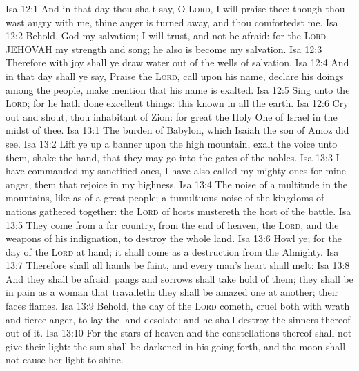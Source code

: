 \vs Isa 12:1 And in that day thou shalt say, O \textsc{Lord}, I will praise thee: though thou wast angry with me, thine anger is turned away, and thou comfortedst me.
\vs Isa 12:2 Behold, God  my salvation; I will trust, and not be afraid: for the \textsc{Lord} JEHOVAH  my strength and  song; he also is become my salvation.
\vs Isa 12:3 Therefore with joy shall ye draw water out of the wells of salvation.
\vs Isa 12:4 And in that day shall ye say, Praise the \textsc{Lord}, call upon his name, declare his doings among the people, make mention that his name is exalted.
\vs Isa 12:5 Sing unto the \textsc{Lord}; for he hath done excellent things: this  known in all the earth.
\vs Isa 12:6 Cry out and shout, thou inhabitant of Zion: for great  the Holy One of Israel in the midst of thee.
\vs Isa 13:1 The burden of Babylon, which Isaiah the son of Amoz did see.
\vs Isa 13:2 Lift ye up a banner upon the high mountain, exalt the voice unto them, shake the hand, that they may go into the gates of the nobles.
\vs Isa 13:3 I have commanded my sanctified ones, I have also called my mighty ones for mine anger,  them that rejoice in my highness.
\vs Isa 13:4 The noise of a multitude in the mountains, like as of a great people; a tumultuous noise of the kingdoms of nations gathered together: the \textsc{Lord} of hosts mustereth the host of the battle.
\vs Isa 13:5 They come from a far country, from the end of heaven,  the \textsc{Lord}, and the weapons of his indignation, to destroy the whole land.
\vs Isa 13:6 Howl ye; for the day of the \textsc{Lord}  at hand; it shall come as a destruction from the Almighty.
\vs Isa 13:7 Therefore shall all hands be faint, and every man's heart shall melt:
\vs Isa 13:8 And they shall be afraid: pangs and sorrows shall take hold of them; they shall be in pain as a woman that travaileth: they shall be amazed one at another; their faces  flames.
\vs Isa 13:9 Behold, the day of the \textsc{Lord} cometh, cruel both with wrath and fierce anger, to lay the land desolate: and he shall destroy the sinners thereof out of it.
\vs Isa 13:10 For the stars of heaven and the constellations thereof shall not give their light: the sun shall be darkened in his going forth, and the moon shall not cause her light to shine.

